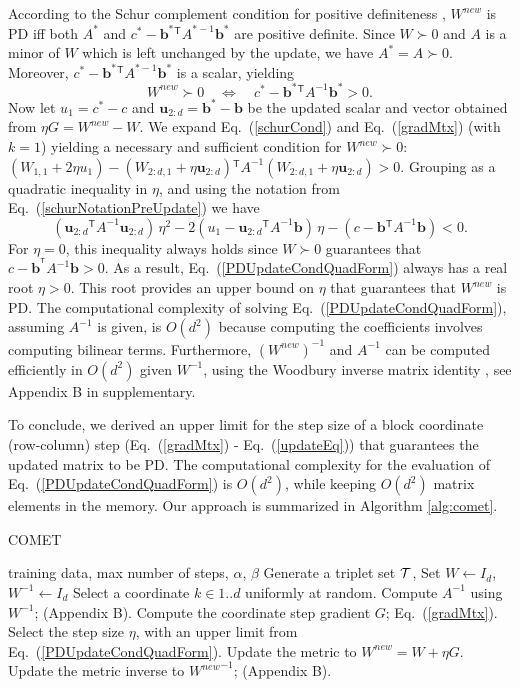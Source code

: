 \documentclass{article} %
\newcommand\mat[1]{{#1}}
\renewcommand\vec[1]{\mathbf{#1}}
\newcommand{\T}{{}^\mathsf{T}}
\newcommand{\W}{\mat{W}}
\newcommand{\newW}{{\mat{W^{new}}}}
\newcommand{\B}{\vec{b}}
\newcommand{\C}{c}
\newcommand{\invA}{A^{-1}}
\newcommand{\uscalar}{{u}_{1}}
\newcommand{\uvec}{\vec{u}_{2:d}}
\newcommand{\Wvec}{\W_{2:d,1}}
\newcommand{\Wscalar}{\W_{1,1}}
\renewcommand{\eqref}[1]{Eq.~(\ref{#1})}
\begin{document}
According to the Schur complement condition for positive definiteness
\citep[p. 650]{boyd2004convex}, $\newW$ is PD iff both
$A^*$ and $\C^* - \B^*\T A^{*-1} \B^*$ are positive definite.
Since $W \succ 0$ and $A$ is a minor of $\W$ which is left unchanged by the update, we have $A^* =
A \succ 0$. Moreover, $\C^* - \B^*\T A^{*-1} \B^*$ is a
scalar, yielding
\begin{equation}
  \newW \succ  0 \quad \Leftrightarrow \quad  \C^* - \B^*\T \invA \B^* >  0.
  \label{schurCond}
\end{equation}
Now let $\uscalar = \C^* - \C$ and $\uvec = \B^* - \B$ be the updated scalar and vector
obtained from $\eta G = \newW - \W$. We expand \eqref{schurCond} and
\eqref{gradMtx} (with $k=1$) yielding a necessary and sufficient condition for $\newW \succ 0$: $(\Wscalar + 2\eta \uscalar)-(\Wvec + \eta \uvec)\T \invA (\Wvec + \eta \uvec)   > 0$.
Grouping as a quadratic inequality in $\eta$, and using the notation from \eqref{schurNotationPreUpdate} we have
\begin{equation}
\label{PDUpdateCondQuadForm}
(\uvec\T \invA \uvec) \, \eta^2 
-2(\uscalar - \uvec\T \invA \B) \,\eta 
-(\C - \B\T  \invA \B) < 0 .
\end{equation}
For $\eta = 0$, this inequality always
holds since $\W \succ 0$ guarantees that $\C-\B^{\T} \invA \B >0$. As a result,
 \eqref{PDUpdateCondQuadForm} always has a real
root $\eta > 0$. This root provides an upper bound on $\eta$ that guarantees that $\newW$ is PD. The computational complexity of solving \eqref{PDUpdateCondQuadForm}, assuming $\invA$ is given, is $O(d^2)$ because computing the coefficients involves computing bilinear terms.
Furthermore, $(\newW)^{-1}$ and $\invA$ can be computed efficiently in $O(d^2)$ given $\W^{-1}$, using the Woodbury inverse matrix identity \cite{woodbury1950inverting}, see Appendix B in supplementary.

To conclude, we derived an upper limit for the step size of a block coordinate (row-column) step (\eqref{gradMtx} - \eqref{updateEq}) that guarantees  the updated matrix to be PD. The computational complexity for the evaluation
of \eqref{PDUpdateCondQuadForm} is $O(d^2)$, while keeping $O(d^2)$ matrix elements in the memory.
Our approach is summarized in Algorithm \ref{alg:comet}.
\begin{algorithm}[tb]
   \caption{COMET}
   \label{alg:comet}
\begin{algorithmic}[1]
    training data, max number of steps, $\alpha$, $\beta$
   \STATE Generate a triplet set $\cal{T}$, Set  $\W  \leftarrow I_d$, $\W^{-1}  \leftarrow I_d$
   \REPEAT 
   \STATE Select a coordinate $k \in {1..d}$ uniformly at random.
   \STATE Compute $\invA$ using $\W^{-1}$; (Appendix B).
   \STATE Compute the coordinate step gradient $G$; \eqref{gradMtx}.
   \STATE Select the step size $\eta$, with an upper limit from \eqref{PDUpdateCondQuadForm}.
   \STATE Update the metric to $\newW=\W+\eta G$.
   \STATE Update the metric inverse to $\newW^{-1}$; (Appendix B).
\end{algorithmic}
\end{algorithm}
\end{document}
